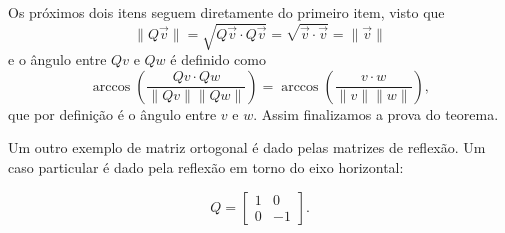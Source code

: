 \documentclass[../livro.tex]{subfiles}  %
\begin{document}
 
 Os próximos dois itens seguem diretamente do primeiro item, visto que 
$$\| Q \vec{v} \| = \sqrt{Q\vec{v} \cdot Q\vec{v}} = \sqrt{\vec{v} \cdot \vec{v}} =  \| \vec{v} \| $$ 
e 
o ângulo entre $Qv$ e $Qw$ é definido como 
$$
\arccos\left(\frac{Qv \cdot Qw	}{\|Qv\| \|Qw\|} \right)
=\arccos\left(\frac{v \cdot w	}{\|v\| \|w\|} \right),$$ 
que por definição é o ângulo  entre $v$ e $w$. 
Assim finalizamos a prova do teorema. 
 
 \medskip
 
 
 Um outro exemplo de matriz ortogonal é dado pelas matrizes de reflexão. Um caso particular é dado pela reflexão em torno do eixo horizontal: 
 
 \[
 Q =
 \begin{bmatrix}
 1 & 0 \\
 0 & -1
 \end{bmatrix} .\]
\end{document}
